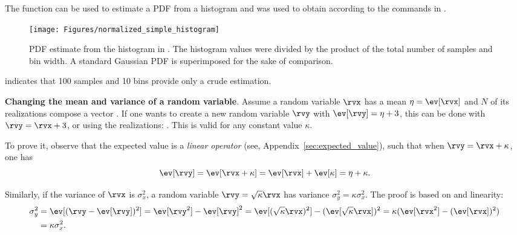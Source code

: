The function  can be used to estimate a PDF from a histogram and was used to obtain
 according to the commands in .


\begin{figure}
	\centering		\texttt{[image: Figures/normalized\_simple\_histogram]}		
	\caption[PDF estimate from the histogram in ]{PDF estimate from the histogram in . The histogram values were divided by the product of the total number of samples and bin width. A standard Gaussian PDF is superimposed for the sake of comparison.\label{fig:normalized_simple_histogram}}
\end{figure}

 indicates that 100 samples and 10 bins provide only a crude estimation.
\eExample 

\bExample \textbf{Changing the mean and variance of a random variable}.
Assume a random variable $\rvx$ has a mean $\eta = \ev[\rvx]$ and $N$ of its realizations compose a vector . 
If one wants to create a new random variable $\rvy$ with $\ev[\rvy] = \eta + 3$, this can be done with
$\rvy = \rvx + 3$, or using the realizations: . 
This is valid for any constant value $\kappa$.

To prove it, observe that the expected value is a \emph{linear operator} (see, Appendix~\ref{sec:expected_value}), such that when $\rvy = \rvx + \kappa$, one has
\begin{equation}
\ev[\rvy] = \ev[\rvx + \kappa] = \ev[\rvx] + \ev[\kappa] = \eta + \kappa.
\label{eq:ev_mean_linear}
\end{equation}

Similarly, if the variance of $\rvx$ is $\sigma_x^2$, a random variable $\rvy = \sqrt{\kappa} \rvx$ has variance $\sigma_y^2 = \kappa \sigma_x^2$.
The proof is based on  and linearity:
\begin{align}
\sigma_y^2 &= \ev[(\rvy- \ev[\rvy])^2] = \ev[\rvy^2] - \ev[\rvy]^2 = \ev[(\sqrt{\kappa} \rvx)^2] - (\ev[\sqrt{\kappa} \rvx])^2 = 
 \kappa (\ev[ \rvx^2] - (\ev[\rvx])^2) \nonumber  \\
  &= \kappa \sigma_x^2.
\label{eq:ev_variance_linear}
\end{align}

